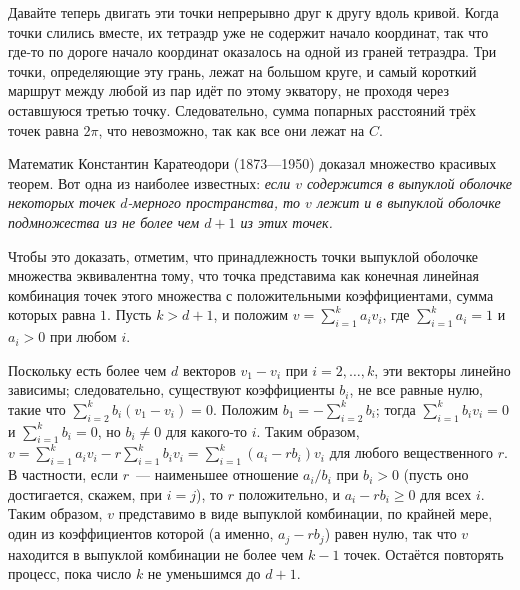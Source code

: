Давайте теперь двигать эти точки непрерывно друг к другу вдоль кривой.
Когда точки слились вместе, их тетраэдр уже не содержит начало координат, так что где-то по дороге начало координат оказалось на одной из граней тетраэдра.
Три точки, определяющие эту грань, лежат на большом круге, и самый короткий маршрут между любой из пар идёт по этому экватору, не проходя через оставшуюся третью точку.
Следовательно, сумма попарных расстояний трёх точек равна $2\pi$, что невозможно, так как все они лежат на $C$.

Математик Константин Каратеодори (1873---1950) доказал множество красивых теорем.
Вот одна из наиболее известных: \textit{если $v$ содержится в выпуклой оболочке некоторых точек $d$-мерного  пространства, то $v$ лежит и в выпуклой оболочке подмножества из не более чем $d+1$ из этих точек.}

Чтобы это доказать, отметим, что принадлежность точки выпуклой оболочке множества
эквивалентна тому, что точка представима как конечная линейная комбинация точек этого множества с положительными коэффициентами, сумма которых равна $1$.
Пусть $k>d+1$, и положим $v=\sum_{i=1}^k a_iv_i$, где $\sum_{i=1}^k a_i=1$ и $a_i>0$ при любом $i$.

Поскольку есть более чем $d$ векторов $v_1-v_i$ при $i=2,\dots,k$, эти векторы линейно зависимы;
следовательно, существуют коэффициенты $b_i$, не все равные нулю, такие что $\sum_{i=2}^k b_i(v_1-v_i)=0$.
Положим $b_1=-\sum_{i=2}^k b_i$; тогда $\sum_{i=1}^k b_i v_i=0$ и $\sum_{i=1}^k b_i=0$, но $b_i\ne 0$ для какого-то $i$.
Таким образом, $v=\sum_{i=1}^k a_iv_i-r\sum_{i=1}^k b_iv_i=\sum_{i=1}^k (a_i-rb_i)v_i$ для любого вещественного $r$.
В частности, если $r$~--- наименьшее отношение $a_i/b_i$  при $b_i>0$ (пусть оно достигается, скажем, при $i=j$), то $r$ положительно, и $a_i-rb_i\ge0$ для всех $i$.
Таким образом, $v$ представимо в виде выпуклой комбинации, по крайней мере, один из коэффициентов которой (а именно, $a_j-rb_j$) равен нулю, так что $v$ находится в выпуклой комбинации не более чем $k-1$ точек.
Остаётся повторять процесс, пока число $k$ не уменьшимся до $d+1$.

